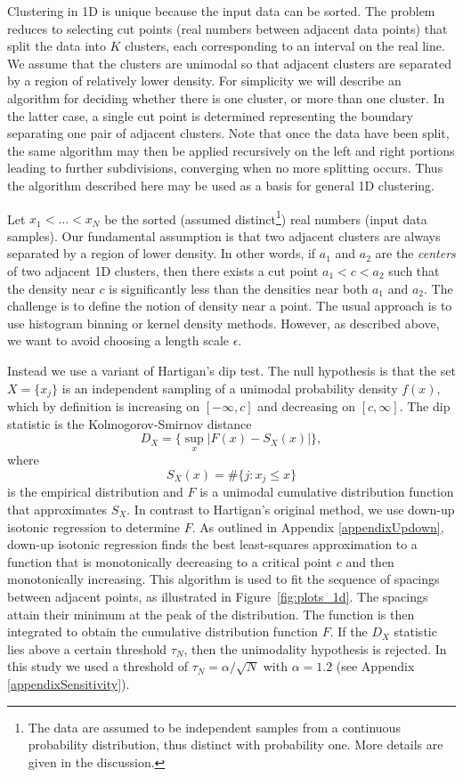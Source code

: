 \documentclass[10pt]{article}
\begin{document}
Clustering in 1D is unique because the input data can be sorted. The problem reduces to selecting cut points (real numbers between adjacent data points) that split the data into $K$ clusters, each corresponding to an interval on the real line. We assume that the clusters are unimodal so that adjacent clusters are separated by a region of relatively lower density. For simplicity we will describe an algorithm for deciding whether there is one cluster, or more than one cluster. In the latter case, a single cut point is determined representing the boundary separating one pair of adjacent clusters. Note that once the data have been split, the same algorithm may then be applied recursively on the left and right portions leading to further subdivisions, converging when no more splitting occurs. Thus the algorithm described here may be used as a basis for general 1D clustering.

Let $x_1<\dots<x_N$ be the sorted (assumed distinct\footnote{The data are assumed to be independent samples from a continuous probability distribution, thus distinct with probability one. More details are given in the discussion.}) real numbers (input data samples). Our fundamental assumption is that two adjacent clusters are always separated by a region of lower density. In other words, if $a_1$ and $a_2$ are the \emph{centers} of two adjacent 1D clusters, then there exists a cut point $a_1<c<a_2$ such that the density near $c$ is significantly less than the densities near both $a_1$ and $a_2$. The challenge is to define the notion of density near a point. The usual approach is to use histogram binning or kernel density methods. However, as described above, we want to avoid choosing a length scale $\epsilon$.

Instead we use a variant of Hartigan's dip test. The null hypothesis is that the set $X=\{x_j\}$ is an independent sampling of a unimodal probability density $f(x)$, which by definition is increasing on $[-\infty,c]$ and decreasing on $[c,\infty]$. The dip statistic is the Kolmogorov-Smirnov distance
$$D_X = \{\sup_x |F(x)-S_X(x)|\},$$
where
$$S_X(x)=\#\{j:x_j\leq x\}$$
is the empirical distribution and $F$ is a unimodal cumulative distribution function that approximates $S_X$. In contrast to Hartigan's original method, we use down-up isotonic regression to determine $F$. As outlined in Appendix \ref{appendixUpdown}, down-up isotonic regression finds the best least-squares approximation to a function that is monotonically decreasing to a critical point $c$ and then monotonically increasing. This algorithm is used to fit the sequence of spacings between adjacent points, as illustrated in Figure~\ref{fig:plots_1d}. The spacings attain their minimum at the peak of the distribution. The function is then integrated to obtain the cumulative distribution function $F$. If the $D_X$ statistic lies above a certain threshold $\tau_{N}$, then the unimodality hypothesis is rejected. In this study we used a threshold of $\tau_{N}=\alpha/\sqrt{N}$ with $\alpha=1.2$ (see Appendix \ref{appendixSensitivity}).
\end{document}
